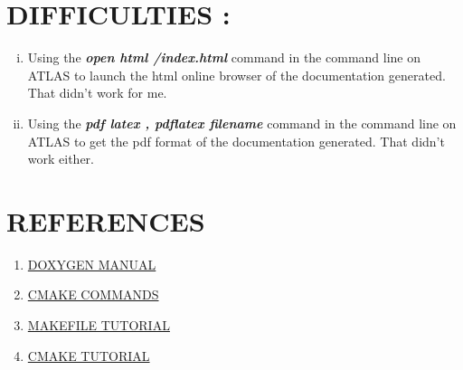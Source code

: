 \documentclass[11pt,utf8]{article}
\begin{document}
 \section{DIFFICULTIES :}
 \begin{enumerate}[i.]
 \item Using the  \textbf{\textit{open html /index.html}} command in the command line on ATLAS to launch the html online browser of the documentation generated.  That  didn't work for me.\\
\item Using the  \textbf{\textit{pdf latex  ,   pdflatex filename}} command in the command line on ATLAS to get the pdf format of the documentation generated.  That  didn't work either.
 
\end{enumerate}
\newpage
\section{REFERENCES}
\begin{enumerate}[1]
\item \href{http://www.stack.nl/~dimitri/doxygen/manual/docblocks.html.}{DOXYGEN MANUAL}   
\item \href{http://www.cmake.org/cmake/help/v3.0/command/option.html}{CMAKE COMMANDS}
\item \href{http://gl.developpez.com/tutoriel/outil/makefile/}{MAKEFILE TUTORIAL}
 \item \href{http://www.cmake.org/cmake-tutorial/}{CMAKE TUTORIAL}
\end{enumerate}
\end{document}
